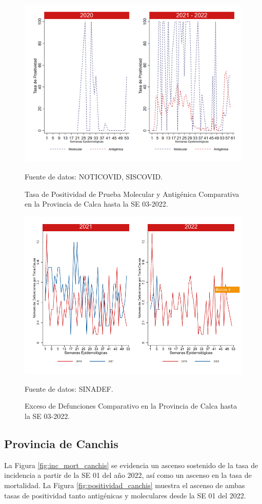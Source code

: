 \documentclass[12pt,a4paper,openany]{book}
\begin{document}
		\begin{figure}[h]
			\caption{Tasa de Positividad de Prueba Molecular y Antigénica Comparativa en la Provincia de Calca hasta la SE 03-2022.}\label{fig:positividad_calca}
			\begin{center}
				\includegraphics[width=0.7\linewidth]{../figuras/positividad_20_21_4.png}
			\end{center}
			{\footnotesize {Fuente de datos: NOTICOVID, SISCOVID.}}
		\end{figure}
		
		\begin{figure}[h]
			\caption{Exceso de Defunciones Comparativo en la Provincia de Calca hasta la SE 03-2022.}\label{fig:exceso_calca}
			\begin{center}
				\includegraphics[width=0.7\linewidth]{../figuras/exceso_4.pdf}
			\end{center}
			{\footnotesize {Fuente de datos: SINADEF.}}
		\end{figure}
		
		\clearpage
		
		\subsection*{Provincia de Canchis}
		\noindent La Figura \ref{fig:inc_mort_canchis} se evidencia un ascenso sostenido de la tasa de incidencia a partir de la SE 01 del año 2022, así como un ascenso en la tasa de mortalidad. 
		\noindent La Figura \ref{fig:positividad_canchis} muestra el ascenso de ambas tasas de positividad tanto antigénicas y moleculares desde la SE 01 del 2022.
		
\end{document}
